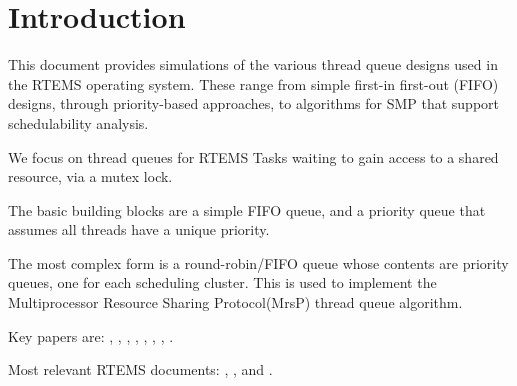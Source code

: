 \section{Introduction}

This document provides simulations of the various thread queue designs used
in the RTEMS operating system. 
These range from simple first-in first-out (FIFO) designs,
through priority-based approaches, 
to algorithms for SMP that support schedulability analysis.

We focus on thread queues for RTEMS Tasks waiting to gain access
to a shared resource, via a mutex lock.

The basic building blocks are a simple FIFO queue, 
and a priority queue that assumes all threads have a unique priority.

The most complex form is a round-robin/FIFO queue 
whose contents are priority queues, 
one for each scheduling cluster.
This is used to implement the 
Multiprocessor Resource Sharing Protocol(MrsP) 
thread queue algorithm.


Key papers are: 
\cite{Burns:2013:MrsP}, 
\cite{Brandenburg:2013:OMIP},
\cite{Catellani:2015:MrsP},
\cite{Garrido:2017:MrsP},
\cite{Zhao:2017:MrsP},
\cite{Gomes:2019:MrsP},
\cite{Zhao:2020:MrsP},
\cite{Zhao:2021:MrsP}
.

Most relevant RTEMS documents:
\cite{RTEMS:CUSER}, 
\cite{RTEMS:ENG}, 
and \cite{RTEMS:USERM}.

